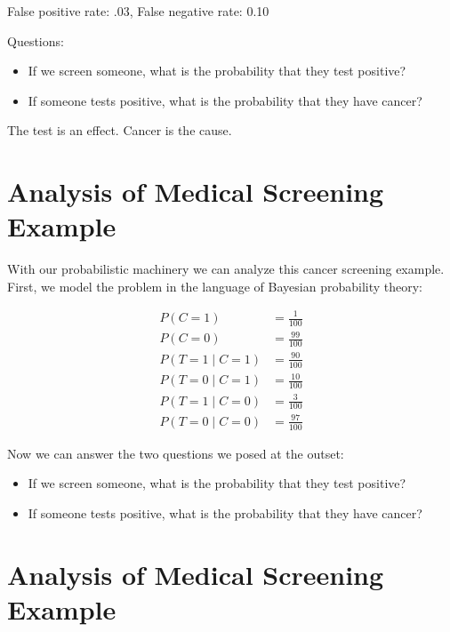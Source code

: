 \documentclass[11pt]{article}
\begin{document}
False positive rate: .03, False negative rate: 0.10


Questions:

\begin{itemize}
\item If we screen someone, what is the probability that they test positive?
\item If someone tests positive, what is the probability that they have cancer?
\end{itemize}

The test is an effect.  Cancer is the cause.
\section{Analysis of Medical Screening Example}
\label{sec:org94e1716}


With our probabilistic machinery we can analyze this cancer screening example.  First, we model the problem in the language of Bayesian probability theory:

\begin{align*}
P(C=1)     &= \frac{1}{100}  \tag{Prior probability that someone has cancer}\\
P(C=0)     &= \frac{99}{100} \tag{Prior probability that someone has no cancer}\\
P(T=1 \mid C=1) &= \frac{90}{100} \tag{Conditional probability of positive test given cancer}\\
P(T=0 \mid C=1) &= \frac{10}{100} \tag{Conditional probability of negative test given cancer}\\
P(T=1 \mid C=0) &= \frac{3}{100}  \tag{Conditional probability of positive test given no cancer}\\
P(T=0 \mid C=0) &= \frac{97}{100} \tag{Conditional probability of negative test given no cancer}
\end{align*}

Now we can answer the two questions we posed at the outset:

\begin{itemize}
\item If we screen someone, what is the probability that they test positive?
\item If someone tests positive, what is the probability that they have cancer?
\end{itemize}
\section{Analysis of Medical Screening Example}
\label{sec:orgbc26c59}
\end{document}
